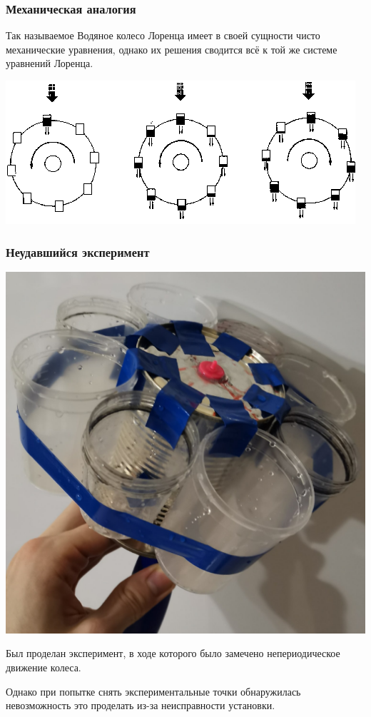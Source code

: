 \begin{frame}
	\frametitle{Механическая аналогия}

	Так называемое Водяное колесо Лоренца имеет в своей сущности чисто механические уравнения, однако их решения сводится всё к той же системе уравнений Лоренца.

	\centering
	\includegraphics[width = 0.8\linewidth]{img/whaterwheel.png}
\end{frame}

\begin{frame}
	\frametitle{Неудавшийся эксперимент}

	\begin{minipage}{0.35\linewidth}
		\includegraphics[width = 1\linewidth]{img/equipment.png}
	\end{minipage}
	\hfill
	\begin{minipage}{0.55\linewidth}
		Был проделан эксперимент, в ходе которого было замечено непериодическое движение колеса.

		Однако при попытке снять экспериментальные точки обнаружилась невозможность это проделать из-за неисправности установки.
	\end{minipage}

\end{frame}